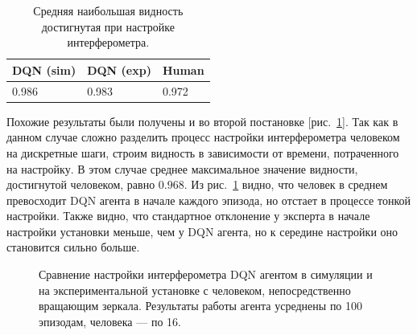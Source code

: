 \begin{table} [htbp]
    \centering
    \begin{threeparttable}
        \caption{Средняя наибольшая видность достигнутая при настройке интерферометра.}\label{tab:highest_visib_dqn}
        \begin{tabular}{| p{5cm} || p{5cm} || p{5cm} |}
            \hline
            \hline
            DQN (sim) & DQN (exp) & Human \\
            \hline
            0.986 & 0.983 & 0.972 \\
            \hline
            \hline
        \end{tabular}
    \end{threeparttable}
\end{table}

Похожие результаты были получены и во второй постановке [рис.~\ref{fig:eval_visib_time}]. Так как в данном случае сложно разделить процесс настройки интерферометра человеком на дискретные шаги, строим видность в зависимости от времени, потраченного на настройку. В этом случае среднее максимальное значение видности, достигнутой человеком, равно $0.968$. Из рис.~\ref{fig:eval_visib_time} видно, что человек в среднем превосходит DQN агента в начале каждого эпизода, но отстает в процессе тонкой настройки. Также видно, что стандартное отклонение у эксперта в начале настройки установки меньше, чем у DQN агента, но к середине настройки оно становится сильно больше. 

\begin{figure}[ht]
\caption{Сравнение настройки интерферометра DQN агентом в симуляции и на экспериментальной установке с человеком, непосредственно вращающим зеркала. Результаты работы агента усреднены по 100 эпизодам, человека --- по 16.}
\label{fig:eval_visib_time}
\end{figure}

